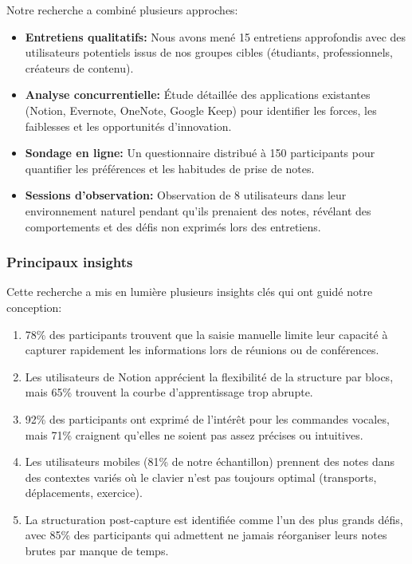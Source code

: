 Notre recherche a combiné plusieurs approches:

\begin{itemize}
    \item \textbf{Entretiens qualitatifs:} Nous avons mené 15 entretiens approfondis avec des utilisateurs potentiels issus de nos groupes cibles (étudiants, professionnels, créateurs de contenu).
    
    \item \textbf{Analyse concurrentielle:} Étude détaillée des applications existantes (Notion, Evernote, OneNote, Google Keep) pour identifier les forces, les faiblesses et les opportunités d'innovation.
    
    \item \textbf{Sondage en ligne:} Un questionnaire distribué à 150 participants pour quantifier les préférences et les habitudes de prise de notes.
    
    \item \textbf{Sessions d'observation:} Observation de 8 utilisateurs dans leur environnement naturel pendant qu'ils prenaient des notes, révélant des comportements et des défis non exprimés lors des entretiens.
\end{itemize}

\subsubsection{Principaux insights}

Cette recherche a mis en lumière plusieurs insights clés qui ont guidé notre conception:

\begin{enumerate}
    \item 78\% des participants trouvent que la saisie manuelle limite leur capacité à capturer rapidement les informations lors de réunions ou de conférences.
    
    \item Les utilisateurs de Notion apprécient la flexibilité de la structure par blocs, mais 65\% trouvent la courbe d'apprentissage trop abrupte.
    
    \item 92\% des participants ont exprimé de l'intérêt pour les commandes vocales, mais 71\% craignent qu'elles ne soient pas assez précises ou intuitives.
    
    \item Les utilisateurs mobiles (81\% de notre échantillon) prennent des notes dans des contextes variés où le clavier n'est pas toujours optimal (transports, déplacements, exercice).
    
    \item La structuration post-capture est identifiée comme l'un des plus grands défis, avec 85\% des participants qui admettent ne jamais réorganiser leurs notes brutes par manque de temps.
\end{enumerate}

